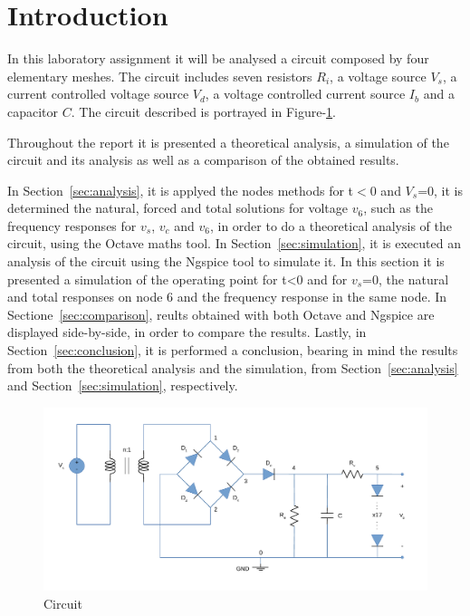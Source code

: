 \section{Introduction}
\label{sec:introduction}

In this laboratory assignment it will be analysed a circuit composed by four
elementary meshes. The circuit includes seven resistors $R_i$, a voltage source
$V_s$, a current controlled voltage source $V_d$, a voltage controlled current
source $I_b$ and a capacitor $C$. The circuit described is portrayed in
Figure-\ref{fig:circuit}.

Throughout the report it is presented a theoretical analysis, a simulation of the
circuit and its analysis as well as a comparison of the obtained results. \par
In Section~\ref{sec:analysis}, it is applyed the nodes methods for t$<$0 and $V_s$=0,
it is determined the natural, forced and total solutions for voltage $v_6$, such as
the frequency responses for $v_s$, $v_c$ and $v_6$, in order to do a theoretical
analysis of the circuit, using the Octave maths tool.
In Section~\ref{sec:simulation}, it is executed an analysis of the circuit using
the Ngspice tool to simulate it. In this section it is presented a simulation of
the operating point for t<0 and for $v_s$=0, the natural and total responses on node 6
and the frequency response in the same node.
In Sectione~\ref{sec:comparison}, reults obtained with both Octave and Ngspice are
displayed side-by-side, in order to compare the results.
Lastly, in Section~\ref{sec:conclusion}, it is performed a conclusion, bearing in mind the
results from both the theoretical analysis and the simulation, from Section~\ref{sec:analysis}
and Section~\ref{sec:simulation}, respectively.


\begin{figure}[h] \centering
\includegraphics[width=0.7\linewidth]{circuit.pdf}
\caption{Circuit}
\label{fig:circuit}
\end{figure}

\newpage
